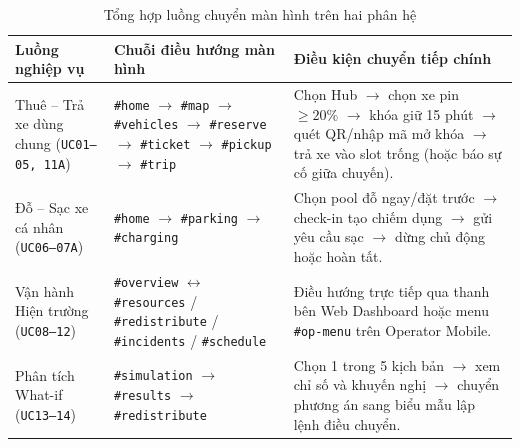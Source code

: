 \begin{table}[H]
\centering
\caption{Tổng hợp luồng chuyển màn hình trên hai phân hệ}
\label{tab:screen-flow}
\begin{tabularx}{\textwidth}{>{\raggedright\arraybackslash}p{3.5cm} >{\raggedright\arraybackslash}p{4.8cm} >{\raggedright\arraybackslash}X}
\toprule
\textbf{Luồng nghiệp vụ} & \textbf{Chuỗi điều hướng màn hình} & \textbf{Điều kiện chuyển tiếp chính} \\
\midrule
Thuê -- Trả xe dùng chung (\texttt{UC01--05, 11A}) & \texttt{\#home} $\to$ \texttt{\#map} $\to$ \texttt{\#vehicles} $\to$ \texttt{\#reserve} $\to$ \texttt{\#ticket} $\to$ \texttt{\#pickup} $\to$ \texttt{\#trip} & Chọn Hub $\to$ chọn xe pin $\ge 20\%$ $\to$ khóa giữ 15 phút $\to$ quét QR/nhập mã mở khóa $\to$ trả xe vào slot trống (hoặc báo sự cố giữa chuyến). \\
\addlinespace[3pt]
Đỗ -- Sạc xe cá nhân (\texttt{UC06--07A}) & \texttt{\#home} $\to$ \texttt{\#parking} $\to$ \texttt{\#charging} & Chọn pool đỗ ngay/đặt trước $\to$ check-in tạo chiếm dụng $\to$ gửi yêu cầu sạc $\to$ dừng chủ động hoặc hoàn tất. \\
\addlinespace[3pt]
Vận hành Hiện trường (\texttt{UC08--12}) & \texttt{\#overview} $\leftrightarrow$ \texttt{\#resources} / \texttt{\#redistribute} / \texttt{\#incidents} / \texttt{\#schedule} & Điều hướng trực tiếp qua thanh bên Web Dashboard hoặc menu \texttt{\#op-menu} trên Operator Mobile. \\
\addlinespace[3pt]
Phân tích What-if (\texttt{UC13--14}) & \texttt{\#simulation} $\to$ \texttt{\#results} $\to$ \texttt{\#redistribute} & Chọn 1 trong 5 kịch bản $\to$ xem chỉ số và khuyến nghị $\to$ chuyển phương án sang biểu mẫu lập lệnh điều chuyển. \\
\bottomrule
\end{tabularx}
\end{table}

